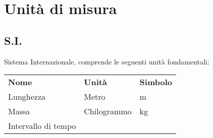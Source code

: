 \section{Unità di misura}\label{unituxe0-di-misura}

\subsection{S.I.}\label{s.i.}

Sistema Internazionale, comprende le seguenti unità fondamentali:

\begin{longtable}[]{@{}
  >{\raggedright\arraybackslash}p{}
  >{\raggedright\arraybackslash}p{}
  >{\raggedright\arraybackslash}p{}@{}}
\toprule\noalign{}
\begin{minipage}[b]{\linewidth}\centering
\textbf{Nome}
\end{minipage} & \begin{minipage}[b]{\linewidth}\centering
\textbf{Unità}
\end{minipage} & \begin{minipage}[b]{\linewidth}\centering
\textbf{Simbolo}
\end{minipage} \\
\begin{minipage}[b]{\linewidth}\centering
Lunghezza
\end{minipage} & \begin{minipage}[b]{\linewidth}\centering
Metro
\end{minipage} & \begin{minipage}[b]{\linewidth}\centering
m
\end{minipage} \\
\begin{minipage}[b]{\linewidth}\centering
Massa
\end{minipage} & \begin{minipage}[b]{\linewidth}\centering
Chilogrammo
\end{minipage} & \begin{minipage}[b]{\linewidth}\centering
kg
\end{minipage} \\
\begin{minipage}[b]{\linewidth}\centering
Intervallo di tempo
\end{minipage} & \begin{minipage}[b]{\linewidth}\centering

\end{minipage}
\end{longtable}
